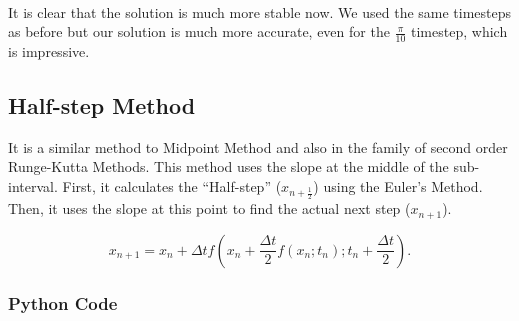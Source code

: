 \documentclass[11pt]{article}
\begin{document}
    \begin{center}
    \end{center}
    { \hspace*{\fill} \\}
    
    It is clear that the solution is much more stable now. We used the same
timesteps as before but our solution is much more accurate, even for the
\(\frac{\pi}{10}\) timestep, which is impressive.

    \hypertarget{half-step-method}{%
\subsection{Half-step Method}\label{half-step-method}}

It is a similar method to Midpoint Method and also in the family of
second order Runge-Kutta Methods. This method uses the slope at the
middle of the sub-interval. First, it calculates the ``Half-step''
(\(x_{n+\frac{1}{2}}\)) using the Euler's Method. Then, it uses the
slope at this point to find the actual next step (\(x_{n+1}\)).

\begin{equation}\label{eq:half_step_method}
    x_{n+1} = x_n + \Delta t f(x_n + \frac{\Delta t}{2}f(x_n;t_n); t_n + \frac{\Delta t}{2}).
\end{equation}

\hypertarget{python-code}{%
\subsubsection{Python Code}\label{python-code-4}}
\end{document}
